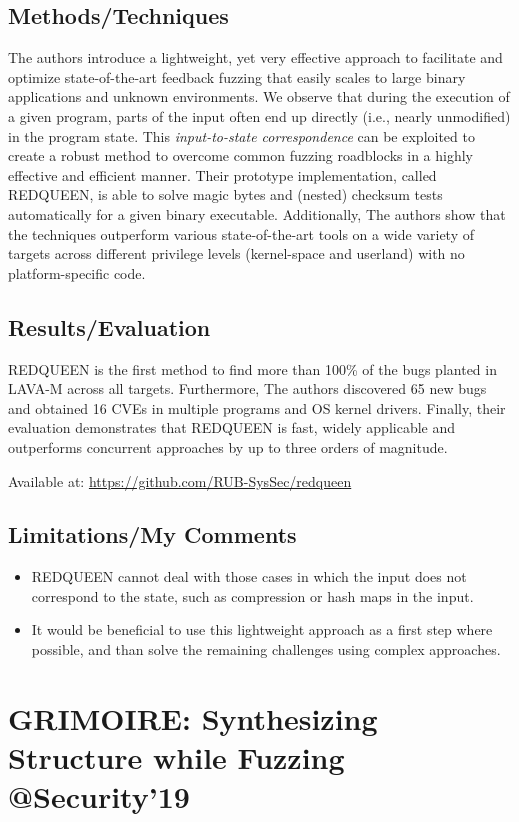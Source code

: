 \subsection{Methods/Techniques}
The authors introduce a lightweight, yet very effective
approach to facilitate
and optimize state-of-the-art feedback fuzzing that easily scales
to large binary applications and unknown environments. We
observe that during the execution of a given program, parts
of the input often end up directly (i.e., nearly unmodified)
in the program state. This \emph{input-to-state correspondence} can
be exploited to create a robust method to overcome common
fuzzing roadblocks in a highly effective and efficient manner.
Their prototype implementation, called REDQUEEN, is able to
solve magic bytes and (nested) checksum tests automatically
for a given binary executable. Additionally, The authors show that the
techniques outperform various state-of-the-art tools on a wide
variety of targets across different privilege levels (kernel-space
and userland) with no platform-specific code.
\subsection{Results/Evaluation}
REDQUEEN is the
first method to find more than 100\% of the bugs planted in
LAVA-M across all targets. Furthermore, The authors discovered
65 new bugs and obtained 16 CVEs in multiple programs and
OS kernel drivers. Finally, their evaluation demonstrates that
REDQUEEN is fast, widely applicable and outperforms concurrent
approaches by up to three orders of magnitude.

Available at: \url{https://github.com/RUB-SysSec/redqueen}
\subsection{Limitations/My Comments}
\begin{itemize}
    \item REDQUEEN cannot deal with those cases in which the input does not correspond to the state, such as compression or hash maps in the input.
    \item It would be beneficial to use this
lightweight approach as a first step where possible, and than
solve the remaining challenges using complex approaches.
\end{itemize}
\newpage

\section{GRIMOIRE: Synthesizing Structure while Fuzzing @Security'19 }
